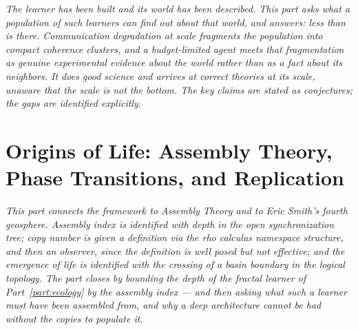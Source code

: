 \documentclass[12pt,openright,twoside]{book}
\theoremstyle{remark}
\theoremstyle{plain}
\theoremstyle{remark}
\theoremstyle{plain}
\theoremstyle{plain}
\begin{document}
\vspace{1em}
\begin{mdframed}[backgroundcolor=remarkgray, linecolor=gray!60,
                 linewidth=1pt, topline=false, rightline=false,
                 bottomline=false]
\small\itshape
The learner has been built and its world has been described.
This part asks what a \emph{population} of such learners can find out
about that world, and answers: less than is there.
Communication degradation at scale fragments the population into compact
coherence clusters, and a budget-limited agent meets that fragmentation
as genuine experimental evidence about the world rather than as a fact
about its neighbors.
It does good science and arrives at correct theories at its scale,
unaware that the scale is not the bottom.
The key claims are stated as conjectures; the gaps are identified
explicitly.
\end{mdframed}

\bigskip


\part{Origins of Life: Assembly Theory, Phase Transitions, and Replication}
\label{part:origins}

\vspace{1em}
\begin{mdframed}[backgroundcolor=remarkgray, linecolor=gray!60,
                 linewidth=1pt, topline=false, rightline=false,
                 bottomline=false]
\small\itshape
This part connects the framework to Assembly Theory and to Eric Smith's
fourth geosphere.
Assembly index is identified with depth in the open synchronization tree;
copy number is given a definition via the rho calculus namespace
structure, and then an observer, since the definition is well posed but
not effective; and the emergence of life is identified with the crossing
of a basin boundary in the logical topology.
The part closes by bounding the depth of the fractal learner of
Part~\ref{part:ecology} by the assembly index --- and then asking what
such a learner must have been assembled from, and why a deep architecture
cannot be had without the copies to populate it.
\end{mdframed}
\end{document}
